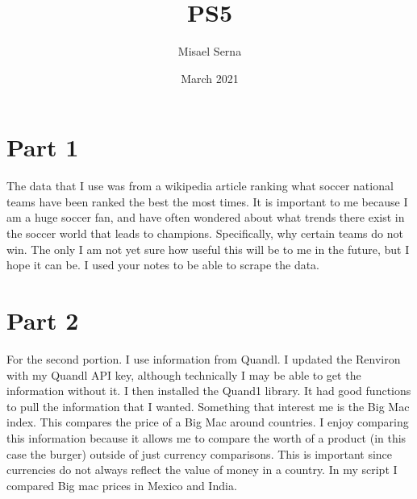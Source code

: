 \documentclass{article}
\title{PS5}
\author{Misael Serna}
\date{March 2021}
\begin{document}
\maketitle

\section{Part 1}
The data that I use was from a wikipedia article ranking what soccer national teams have been ranked the best the most times.
It is important to me because I am a huge soccer fan, and have often wondered about what trends there exist in the soccer world that leads to champions. 
Specifically, why certain teams do not win. The only I am not yet sure how useful this will be to me in the future, but I hope it can be. I used your notes to be able to scrape the data.



\section{Part 2}
For the second portion. I use information from Quandl. I updated the Renviron with my Quandl API key, although technically I may be able to get the information without it. I then installed the Quand1 library. It had good functions to pull the information that I wanted. Something that interest me is the Big Mac index. This compares the price of a Big Mac around countries. I enjoy comparing this information because it allows me to compare the worth of a product (in this case the burger) outside of just currency comparisons. This is important since currencies do not always reflect the value of money in a country. In my script I compared Big mac prices in Mexico and India.
\end{document}
